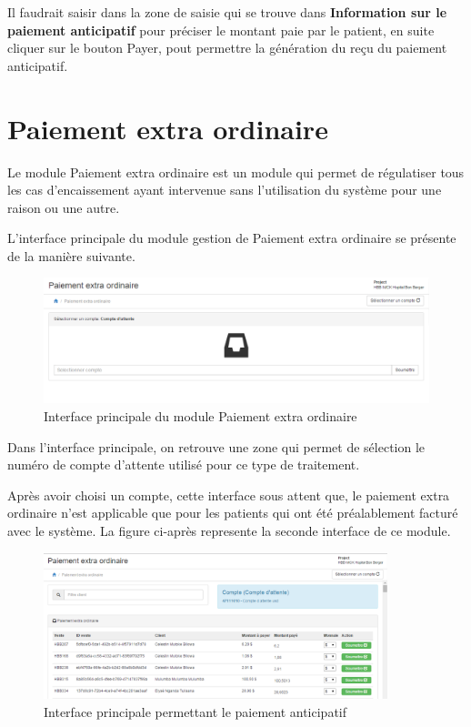 \documentclass[12pt,a4paper]{report}
\begin{document}
Il faudrait saisir dans la zone de saisie qui se trouve dans \textbf{Information sur le paiement anticipatif} pour préciser le montant paie par le patient, en suite cliquer sur le bouton Payer, pout permettre la génération du reçu du paiement anticipatif.

\newpage
\section{Paiement extra ordinaire}
Le module Paiement extra ordinaire est un module qui permet de régulatiser tous les cas d'encaissement ayant intervenue sans l'utilisation du système pour une raison ou une autre.

L'interface principale du module gestion de Paiement extra ordinaire se présente de la manière suivante.

\begin{figure}[h]
\begin{center}
\includegraphics[width=14cm]{pic/PaieExtraOrdinaire.png}
\end{center}
\caption{Interface principale du module Paiement extra ordinaire}
\label{Interface principale du module Paiement extra ordinaire}
\end{figure}

Dans l'interface principale, on retrouve une zone qui permet de sélection le numéro de compte d'attente utilisé pour ce type de traitement. 

Après avoir choisi un compte, cette interface sous attent que, le paiement extra ordinaire n'est applicable que pour les patients qui ont été préalablement facturé avec le système. La figure ci-après represente la seconde interface de ce module.

\begin{figure}[h]
\begin{center}
\includegraphics[width=10cm]{pic/ExtraOrdi.png}
\end{center}
\caption{Interface principale permettant le paiement anticipatif}
\label{Interface principale permettant le paiement anticipatif}
\end{figure}
\end{document}
